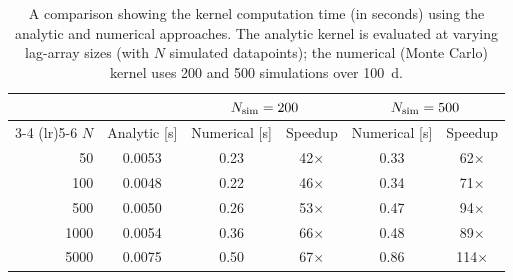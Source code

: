 \begin{table}[ht!]
    \centering
    \caption{A comparison showing the kernel computation time (in seconds) using the analytic and numerical approaches. The analytic kernel is evaluated at varying lag-array sizes (with $N$ simulated datapoints); the numerical (Monte Carlo) kernel uses 200 and 500 simulations over 100~d.}
    \label{tab:kernel_speed}
    \begin{tabular}{rccccc}
    \toprule
    & & \multicolumn{2}{c}{$N_{\rm sim}=200$} & \multicolumn{2}{c}{$N_{\rm sim}=500$} \\
    \cmidrule(lr){3-4} \cmidrule(lr){5-6}
    $N$ & Analytic [s] & Numerical [s] & Speedup & Numerical [s] & Speedup \\
    \midrule
    50 & 0.0053 & 0.23 & 42$\times$ & 0.33 & 62$\times$ \\
    100 & 0.0048 & 0.22 & 46$\times$ & 0.34 & 71$\times$ \\
    500 & 0.0050 & 0.26 & 53$\times$ & 0.47 & 94$\times$ \\
    1000 & 0.0054 & 0.36 & 66$\times$ & 0.48 & 89$\times$ \\
    5000 & 0.0075 & 0.50 & 67$\times$ & 0.86 & 114$\times$ \\
    \bottomrule
    \end{tabular}
\end{table}